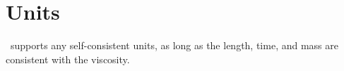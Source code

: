 \section{Units}

\iamr\ supports any self-consistent units, as long as the length, time, and mass are
consistent with the viscosity.
